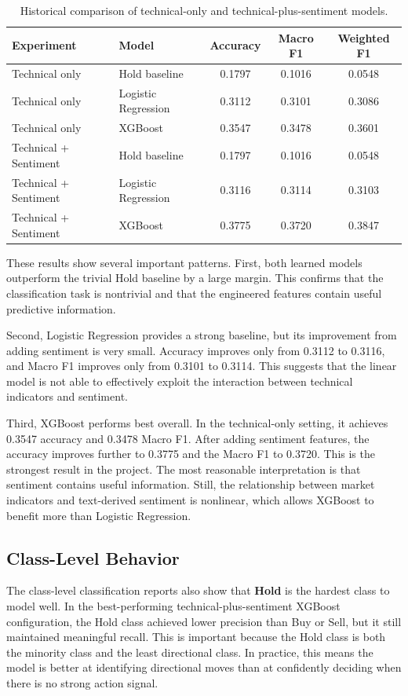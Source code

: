 \documentclass[11pt]{article}
\begin{document}
\begin{table}[h]
\centering
\begin{tabular}{|l|l|c|c|c|}
\hline
Experiment & Model & Accuracy & Macro F1 & Weighted F1 \\
\hline
Technical only & Hold baseline & 0.1797 & 0.1016 & 0.0548 \\
Technical only & Logistic Regression & 0.3112 & 0.3101 & 0.3086 \\
Technical only & XGBoost & 0.3547 & 0.3478 & 0.3601 \\
Technical + Sentiment & Hold baseline & 0.1797 & 0.1016 & 0.0548 \\
Technical + Sentiment & Logistic Regression & 0.3116 & 0.3114 & 0.3103 \\
Technical + Sentiment & XGBoost & 0.3775 & 0.3720 & 0.3847 \\
\hline
\end{tabular}
\caption{Historical comparison of technical-only and technical-plus-sentiment models.}
\label{tab:mainresults}
\end{table}

These results show several important patterns. First, both learned models outperform the trivial Hold baseline by a large margin. This confirms that the classification task is nontrivial and that the engineered features contain useful predictive information.

Second, Logistic Regression provides a strong baseline, but its improvement from adding sentiment is very small. Accuracy improves only from 0.3112 to 0.3116, and Macro F1 improves only from 0.3101 to 0.3114. This suggests that the linear model is not able to effectively exploit the interaction between technical indicators and sentiment.

Third, XGBoost performs best overall. In the technical-only setting, it achieves 0.3547 accuracy and 0.3478 Macro F1. After adding sentiment features, the accuracy improves further to 0.3775 and the Macro F1 to 0.3720. This is the strongest result in the project. The most reasonable interpretation is that sentiment contains useful information. Still, the relationship between market indicators and text-derived sentiment is nonlinear, which allows XGBoost to benefit more than Logistic Regression.

\subsection{Class-Level Behavior}

The class-level classification reports also show that \textbf{Hold} is the hardest class to model well. In the best-performing technical-plus-sentiment XGBoost configuration, the Hold class achieved lower precision than Buy or Sell, but it still maintained meaningful recall. This is important because the Hold class is both the minority class and the least directional class. In practice, this means the model is better at identifying directional moves than at confidently deciding when there is no strong action signal.
\end{document}

